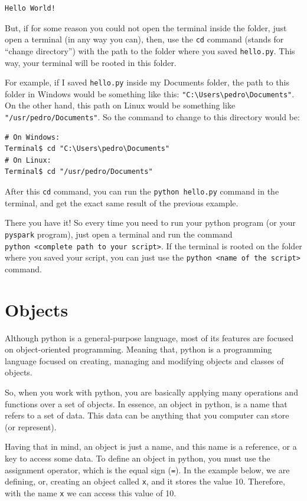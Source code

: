 \documentclass[
  11pt,
  letterpaper,
  DIV=11,
  numbers=noendperiod]{scrreprt}
\begin{document}
\begin{verbatim}
Hello World!
\end{verbatim}

But, if for some reason you could not open the terminal inside the
folder, just open a terminal (in any way you can), then, use the
\texttt{cd} command (stands for ``change directory'') with the path to
the folder where you saved \texttt{hello.py}. This way, your terminal
will be rooted in this folder.

For example, if I saved \texttt{hello.py} inside my Documents folder,
the path to this folder in Windows would be something like this:
\texttt{"C:\textbackslash{}Users\textbackslash{}pedro\textbackslash{}Documents"}.
On the other hand, this path on Linux would be something like
\texttt{"/usr/pedro/Documents"}. So the command to change to this
directory would be:

\begin{verbatim}
# On Windows:
Terminal$ cd "C:\Users\pedro\Documents"
# On Linux:
Terminal$ cd "/usr/pedro/Documents"
\end{verbatim}

After this \texttt{cd} command, you can run the
\texttt{python\ hello.py} command in the terminal, and get the exact
same result of the previous example.

There you have it! So every time you need to run your python program (or
your \texttt{pyspark} program), just open a terminal and run the command
\texttt{python\ \textless{}complete\ path\ to\ your\ script\textgreater{}}.
If the terminal is rooted on the folder where you saved your script, you
can just use the
\texttt{python\ \textless{}name\ of\ the\ script\textgreater{}} command.

\section{Objects}\label{objects}

Although python is a general-purpose language, most of its features are
focused on object-oriented programming. Meaning that, python is a
programming language focused on creating, managing and modifying objects
and classes of objects.

So, when you work with python, you are basically applying many
operations and functions over a set of objects. In essence, an object in
python, is a name that refers to a set of data. This data can be
anything that you computer can store (or represent).

Having that in mind, an object is just a name, and this name is a
reference, or a key to access some data. To define an object in python,
you must use the assignment operator, which is the equal sign
(\texttt{=}). In the example below, we are defining, or, creating an
object called \texttt{x}, and it stores the value 10. Therefore, with
the name \texttt{x} we can access this value of 10.
\end{document}
